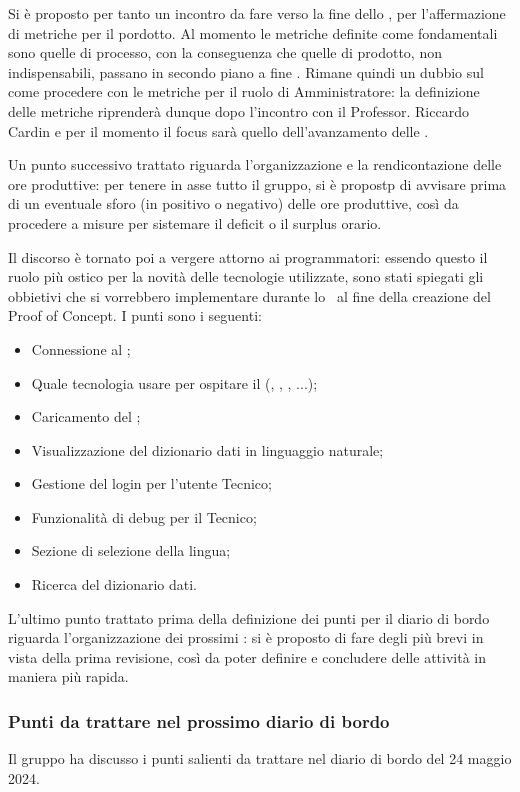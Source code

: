 Si è proposto per tanto un incontro da fare verso la fine dello , per l'affermazione di metriche per il pordotto.
Al momento le metriche definite come fondamentali sono quelle di processo, con la conseguenza che quelle di prodotto, non indispensabili, passano in secondo piano a fine .
Rimane quindi un dubbio sul come procedere con le metriche per il ruolo di Amministratore: la definizione delle metriche riprenderà dunque dopo l'incontro con il Professor. Riccardo Cardin e per il momento il focus sarà quello dell'avanzamento delle \NdP.
\par Un punto successivo trattato riguarda l'organizzazione e la rendicontazione delle ore produttive: per tenere in asse tutto il gruppo, si è propostp di avvisare prima di un eventuale sforo (in positivo o negativo) delle ore produttive, così da procedere a misure per sistemare il deficit o il surplus orario.
\par Il discorso è tornato poi a vergere attorno ai programmatori: essendo questo il ruolo più ostico per la novità delle tecnologie utilizzate, sono stati spiegati gli obbietivi che si vorrebbero implementare durante lo \ al fine della creazione del Proof of Concept. I punti sono i seguenti:
\begin{itemize}
	\item Connessione al ;
	\item Quale tecnologia usare per ospitare il  (, , , ...);
	\item Caricamento del ;
	\item Visualizzazione del dizionario dati in linguaggio naturale;
	\item Gestione del login per l'utente Tecnico; 
	\item Funzionalità di debug per il Tecnico;
	\item Sezione di selezione della lingua;
	\item Ricerca del dizionario dati.
\end{itemize}
\par L'ultimo punto trattato prima della definizione dei punti per il diario di bordo riguarda l'organizzazione dei prossimi : si è proposto di fare degli  più brevi in vista della prima revisione, così da poter definire e concludere delle attività in maniera più rapida.

\subsubsection{Punti da trattare nel prossimo diario di bordo}
\par Il gruppo ha discusso i punti salienti da trattare nel diario di bordo del 24 maggio 2024.
